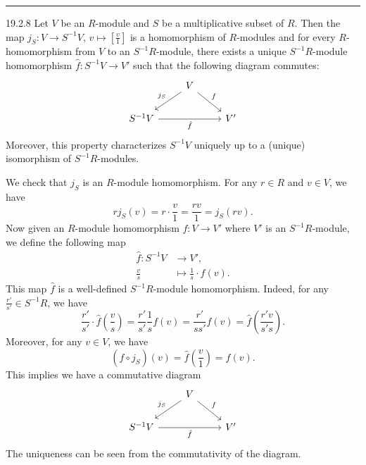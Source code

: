 \documentclass[a4paper, 12pt]{article}
\begin{document}
\noindent\rule{7in}{2.8pt}
\begin{problem}{19.2.8}
Let \(V\) be an \(R\)-module and \(S\) be a multiplicative subset of \(R\). Then the map \(j_S:V\rightarrow S^{-1}V\), \(v\mapsto [\frac{v}{1}]\) is a homomorphism of \(R\)-modules and for every \(R\)-homomorphism from \(V\) to an \(S^{-1}R\)-module, there exists a unique \(S^{-1}R\)-module homomorphism \(\hat{f}:S^{-1}V\rightarrow V'\) such that the following diagram commutes:
\[\begin{tikzcd}
	& V \\
	{S^{-1}V} && {V'}
	\arrow["{j_S}"', from=1-2, to=2-1]
	\arrow["f", from=1-2, to=2-3]
	\arrow["{\hat{f}}"', from=2-1, to=2-3]
\end{tikzcd}\]
Moreover, this property characterizes \(S^{-1}V\) uniquely up to a (unique) isomorphism of \(S^{-1}R\)-modules.
\end{problem}
\begin{solution}
We check that \(j_S\) is an \(R\)-module homomorphism. For any \(r\in R\) and \(v\in V\), we have 
\[r j_S(v)=r\cdot \frac{v}{1}=\frac{rv}{1}=j_S(rv).\]
Now given an \(R\)-module homomorphism \(f:V\rightarrow V'\) where \(V'\) is an \(S^{-1}R\)-module, we define the following map 
\begin{align*}
    \hat{f}: S^{-1}V&\rightarrow V',\\ 
             \frac{v}{s}&\mapsto \frac{1}{s}\cdot f(v).
\end{align*} 
This map \(\hat{f}\) is a well-defined \(S^{-1}R\)-module homomorphism. Indeed, for any \(\frac{r'}{s'}\in S^{-1}R\), we have 
\[\frac{r'}{s'}\cdot \hat{f}(\frac{v}{s})=\frac{r'}{s'}\frac{1}{s}f(v)=\frac{r'}{ss'}f(v)=\hat{f}(\frac{r'v}{s's}).\]
Moreover, for any \(v\in V\), we have 
\[(\hat{f}\circ j_S)(v)=\hat{f}(\frac{v}{1})=f(v).\]
This implies we have a commutative diagram 
\[\begin{tikzcd}
	& V \\
	{S^{-1}V} && {V'}
	\arrow["{j_S}"', from=1-2, to=2-1]
	\arrow["f", from=1-2, to=2-3]
	\arrow["{\hat{f}}"', from=2-1, to=2-3]
\end{tikzcd}\]
The uniqueness can be seen from the commutativity of the diagram.
\end{solution}
\end{document}
